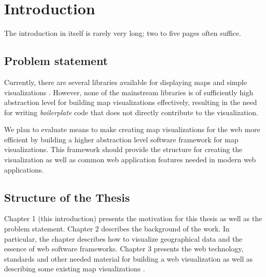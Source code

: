 
\chapter{Introduction}
\label{chapter:intro}

The introduction in itself is rarely very long; two to five pages often
suffice.

\section{Problem statement}

Currently, there are several libraries available for displaying maps and simple visualizations . However, none of the mainstream libraries is of sufficiently high abstraction level for building map visualizations effectively, resulting in the need for writing \emph{boilerplate} code that does not directly contribute to the visualization.

We plan to evaluate means to make creating map visualizations for the web more efficient by building a higher abstraction level software framework for map visualizations. This framework should provide the structure for creating the visualization as well as common web application features needed in modern web applications.



\section{Structure of the Thesis}
\label{section:structure} 

Chapter 1 (this introduction) presents the motivation for this thesis as well as the problem statement. Chapter 2 describes the background of the work. In particular, the chapter describes how to visualize geographical data and the essence of web software frameworks. Chapter 3 presents the web technology, standards and other needed material for building a web visualization as well as describing some existing map visualizations .

